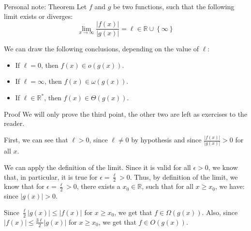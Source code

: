 \documentclass[a4paper]{article}
\begin{document}
\begin{parag}{Personal note: Theorem}
    Let $f$ and $g$ be two functions, such that the following limit exists or diverges:
    \[\lim_{x \to \infty} \frac{\left|f\left(x\right)\right|}{\left|g\left(x\right)\right|} = \ell \in \mathbb{R} \cup \left\{\infty\right\}\]
    
    We can draw the following conclusions, depending on the value of $\ell $:
    \begin{itemize}
        \item If $\ell = 0$, then $f\left(x\right) \in o\left(g\left(x\right)\right)$.
        \item If $\ell = \infty$, then $f\left(x\right) \in \omega\left(g\left(x\right)\right)$.
        \item If $\ell \in \mathbb{R}^*$, then $f\left(x\right) \in \Theta\left(g\left(x\right)\right)$.
    \end{itemize}
    
    \begin{subparag}{Proof}
        We will only prove the third point, the other two are left as exercises to the reader.

        First, we can see that $\ell > 0$, since $\ell \neq 0$ by hypothesis and since $\frac{\left|f\left(x\right)\right|}{\left|g\left(x\right)\right|} > 0$ for all $x$.


        We can apply the definition of the limit. Since it is valid for all $\epsilon > 0$, we know that, in particular, it is true for $\epsilon = \frac{\ell }{2} > 0$. Thus, by definition of the limit, we know that for $\epsilon = \frac{\ell }{2} > 0$, there exists a $x_0 \in \mathbb{R}$, such that for all $x \geq x_0$, we have:
        since $\left|g\left(x\right)\right| > 0$.

        Since $\frac{\ell }{2} \left|g\left(x\right)\right| \leq \left|f\left(x\right)\right|$ for $x \geq x_0$, we get that $f \in \Omega\left(g\left(x\right)\right)$. Also, since $\left|f\left(x\right)\right| \leq \frac{3 \ell }{2} \left|g\left(x\right)\right|$ for $x \geq x_0$, we get that $f \in O\left(g\left(x\right)\right)$. 


\end{subparag}
\end{parag}
\end{document}
